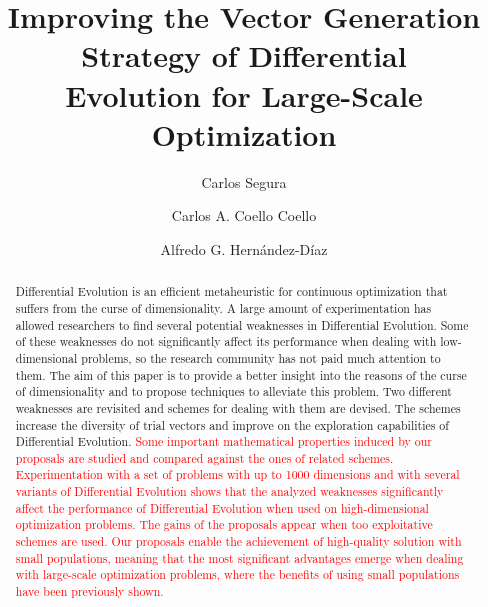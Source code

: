 \documentclass[review,3p]{elsarticle}
\begin{document}
\begin{frontmatter}

\title{Improving the Vector Generation Strategy of Differential \\ Evolution for Large-Scale Optimization}

\author[label1]{Carlos Segura}

\author[label2]{Carlos A. Coello Coello}

\author[label3]{Alfredo G. Hern\'andez-D\'iaz}

\address[label1]{Area of Computer Science, Centre for Research in Mathematics (CIMAT), Callej\'on Jalisco s/n, Mineral de Valenciana, Guanajuato, Guanajuato 36240, Mexico}
\address[label2]{Evolutionary Computation Group, Department of Computer Science, Center of Research and Advanced Studies, National Polytechnic Institute, Mexico City 07300, Mexico}
\address[label3]{Department of Economics, Quantitative Methods and Economic History, Pablo de Olavide University, Seville, Spain}

\begin{abstract}
Differential Evolution is an efficient metaheuristic for continuous optimization that suffers from the curse of dimensionality.
A large amount of experimentation has allowed researchers to find
several potential weaknesses in Differential Evolution.
Some of these weaknesses do not significantly affect its performance when dealing with low-dimensional problems,
so the research community has not paid much attention to them.
The aim of this paper is to provide a better insight into the reasons of the curse of dimensionality
and to propose techniques to alleviate this problem.
Two different weaknesses are revisited and schemes for dealing with them are devised.
The schemes increase the diversity of trial vectors and improve on the exploration capabilities of Differential Evolution.
\textcolor{red}{
Some important mathematical properties induced by our proposals are studied and compared against the ones of related schemes.
Experimentation with a set of problems with up to 1000 dimensions and with several variants of Differential Evolution
shows that the analyzed weaknesses
significantly affect the performance of Differential Evolution when used on high-dimensional optimization problems.
The gains of the proposals appear when too exploitative schemes are used.
Our proposals enable the achievement of high-quality solution with small populations,
meaning that the most significant advantages emerge when dealing with large-scale optimization problems,
where the benefits of using small populations have been previously shown.
}
\end{abstract}


\end{frontmatter}
\end{document}
